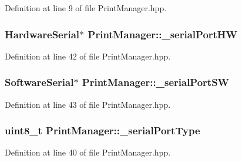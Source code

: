 Definition at line 9 of file Print\+Manager.\+hpp.

\subsubsection[{\texorpdfstring{\+\_\+serial\+Port\+HW}{_serialPortHW}}]{\setlength{\rightskip}{0pt plus 5cm}Hardware\+Serial$\ast$ Print\+Manager\+::\+\_\+serial\+Port\+HW\hspace{0.3cm}{\ttfamily [protected]}}\hypertarget{class_print_manager_a19cd58c07357e6142b92ed4598cda1bc}{}\label{class_print_manager_a19cd58c07357e6142b92ed4598cda1bc}


Definition at line 42 of file Print\+Manager.\+hpp.

\subsubsection[{\texorpdfstring{\+\_\+serial\+Port\+SW}{_serialPortSW}}]{\setlength{\rightskip}{0pt plus 5cm}Software\+Serial$\ast$ Print\+Manager\+::\+\_\+serial\+Port\+SW\hspace{0.3cm}{\ttfamily [protected]}}\hypertarget{class_print_manager_aa079f14838d51ffd18ac814323c3d177}{}\label{class_print_manager_aa079f14838d51ffd18ac814323c3d177}


Definition at line 43 of file Print\+Manager.\+hpp.

\subsubsection[{\texorpdfstring{\+\_\+serial\+Port\+Type}{_serialPortType}}]{\setlength{\rightskip}{0pt plus 5cm}uint8\+\_\+t Print\+Manager\+::\+\_\+serial\+Port\+Type\hspace{0.3cm}{\ttfamily [protected]}}\hypertarget{class_print_manager_ae1b8f767b738748027e0ac2a97f1be6c}{}\label{class_print_manager_ae1b8f767b738748027e0ac2a97f1be6c}


Definition at line 40 of file Print\+Manager.\+hpp.

